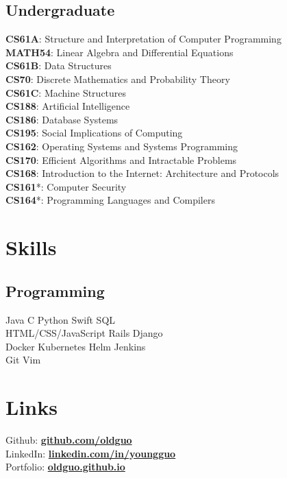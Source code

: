 \documentclass[]{deedy-resume}
\begin{document}
\begin{minipage}[t]{0.33\textwidth}
\subsection{Undergraduate}
\textbf{CS61A}: Structure and Interpretation of Computer Programming\\
\textbf{MATH54}: Linear Algebra and Differential Equations\\
\textbf{CS61B}: Data Structures\\
\textbf{CS70}: Discrete Mathematics and Probability Theory\\
\textbf{CS61C}: Machine Structures\\
\textbf{CS188}: Artificial Intelligence\\
\textbf{CS186}: Database Systems\\
\textbf{CS195}: Social Implications of Computing\\
\textbf{CS162}: Operating Systems and Systems Programming\\
\textbf{CS170}: Efficient Algorithms and Intractable Problems\\
\textbf{CS168}: Introduction to the Internet: Architecture and Protocols\\
\textbf{CS161}*: Computer Security\\
\textbf{CS164}*: Programming Languages and Compilers

\sectionsep{}


\section{Skills}
\subsection{Programming}
Java \textbullet{} C \textbullet{} Python \textbullet{} Swift \textbullet{} SQL\\
HTML/CSS/JavaScript \textbullet{} Rails \textbullet{} Django\\
Docker \textbullet{} Kubernetes \textbullet{} Helm \textbullet{} Jenkins\\
Git \textbullet{} Vim
\sectionsep{}


\section{Links}
Github: \href{https://github.com/oldguo}{\textbf{github.com/oldguo}} \\
LinkedIn: \href{https://linkedin.com/in/youngguo}{\textbf{linkedin.com/in/youngguo}} \\
Portfolio: \href{https://oldguo.github.io/}{\textbf{oldguo.github.io}}
\sectionsep{}


%
%

\end{minipage}
\end{document}
